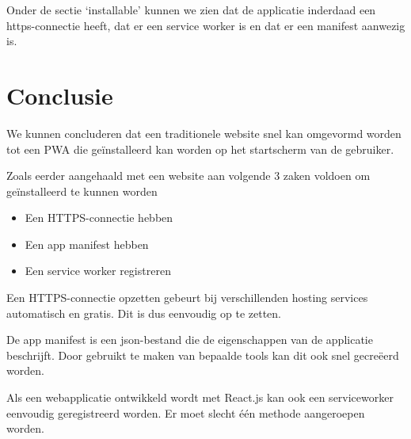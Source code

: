 	Onder de sectie ‘installable’ kunnen we zien dat de applicatie inderdaad een https-connectie heeft, dat er een service worker is en dat er een manifest aanwezig is.
	
	
	
\section{Conclusie}

	We kunnen concluderen dat een traditionele website snel kan omgevormd worden tot een PWA die geïnstalleerd kan worden op het startscherm van de gebruiker. 
	
	Zoals eerder aangehaald met een website aan volgende 3 zaken voldoen om geïnstalleerd te kunnen worden
	\begin{itemize}
		\item Een HTTPS-connectie hebben
		\item Een app manifest hebben
		\item Een service worker registreren
	\end{itemize}	
	
	Een HTTPS-connectie opzetten gebeurt bij verschillenden hosting services automatisch en gratis. Dit is dus eenvoudig op te zetten.
	
	De app manifest is een json-bestand die de eigenschappen van de applicatie beschrijft. Door gebruikt te maken van bepaalde tools kan dit ook snel gecreëerd worden.
	
	Als een webapplicatie ontwikkeld wordt met React.js kan ook een serviceworker eenvoudig geregistreerd worden. Er moet slecht één methode aangeroepen worden.
